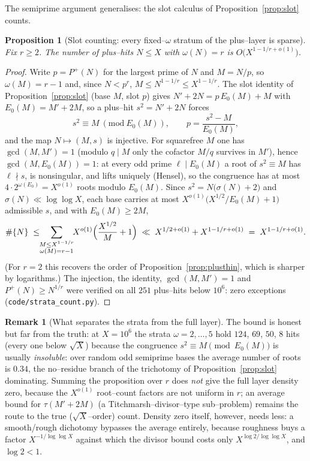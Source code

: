 \documentclass[11pt]{article}
\newtheorem{proposition}[theorem]{Proposition}
\theoremstyle{definition}
\newtheorem{remark}[theorem]{Remark}
\begin{document}
The semiprime argument generalises: the slot calculus of Proposition~\ref{prop:slot} counts.

\begin{proposition}[Slot counting: every fixed--$\omega$ stratum of the plus--layer is sparse]\label{prop:strata}
Fix $r\ge2$. The number of plus--hits $N\le X$ with $\omega(N)=r$ is $O\bigl(X^{1-1/r+o(1)}\bigr)$.
\end{proposition}
\begin{proof}
Write $p=P^+(N)$ for the largest prime of $N$ and $M=N/p$, so $\omega(M)=r-1$ and, since $N<p^r$,
$M\le N^{1-1/r}\le X^{1-1/r}$. The slot identity of Proposition~\ref{prop:slot} (base $M$, slot $p$)
gives $N'+2N=p\,E_0(M)+M$ with $E_0(M)=M'+2M$, so a plus--hit $s^2=N'+2N$ forces
\[ s^2\equiv M\ (\mathrm{mod}\ E_0(M)),\qquad p=\frac{s^2-M}{E_0(M)}, \]
and the map $N\mapsto(M,s)$ is injective. For squarefree $M$ one has $\gcd(M,M')=1$ (modulo
$q\mid M$ only the cofactor $M/q$ survives in $M'$), hence $\gcd(M,E_0(M))=1$: at every odd prime
$\ell\mid E_0(M)$ a root of $s^2\equiv M$ has $\ell\nmid s$, is nonsingular, and lifts uniquely
(Hensel), so the congruence has at most $4\cdot2^{\omega(E_0)}=X^{o(1)}$ roots modulo $E_0(M)$.
Since $s^2=N\bigl(\sigma(N)+2\bigr)$ and $\sigma(N)\ll\log\log X$, each base carries at most
$X^{o(1)}\bigl(X^{1/2}/E_0(M)+1\bigr)$ admissible $s$, and with $E_0(M)\ge2M$,
\[ \#\{N\}\;\le\!\!\sum_{\substack{M\le X^{1-1/r}\\ \omega(M)=r-1}}\!\!X^{o(1)}\Bigl(\frac{X^{1/2}}{M}+1\Bigr)
\;\ll\;X^{1/2+o(1)}+X^{1-1/r+o(1)}\;=\;X^{1-1/r+o(1)}. \]
(For $r=2$ this recovers the order of Proposition~\ref{prop:plusthin}, which is sharper by
logarithms.) The injection, the identity, $\gcd(M,M')=1$ and $P^+(N)\ge N^{1/r}$ were verified on
all $251$ plus--hits below $10^6$: zero exceptions (\texttt{code/strata\_count.py}).
\end{proof}

\begin{remark}[What separates the strata from the full layer]\label{rem:strata}
The bound is honest but far from the truth: at $X=10^6$ the strata $\omega=2,\dots,5$ hold
$124$, $69$, $50$, $8$ hits (every one below $\sqrt X$) because the congruence
$s^2\equiv M\pmod{E_0(M)}$ is usually \emph{insoluble}: over random odd semiprime bases the average
number of roots is $0.34$, the no--residue branch of the trichotomy of Proposition~\ref{prop:slot}
dominating. Summing the proposition over $r$ does \emph{not} give the full layer density zero,
because the $X^{o(1)}$ root--count factors are not uniform in $r$; an average bound for
$\tau(M'+2M)$ (a Titchmarsh--divisor--type sub--problem) remains the route to the true
($\sqrt X$--order) count. Density zero itself, however, needs less: a smooth/rough dichotomy
bypasses the average entirely, because roughness buys a factor $X^{-1/\log\log X}$ against which
the divisor bound costs only $X^{\log2/\log\log X}$, and $\log2<1$.
\end{remark}
\end{document}
